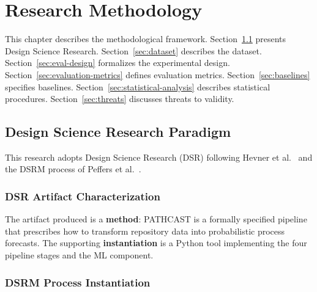
\chapter{Research Methodology}
\label{ch:methodology}

This chapter describes the methodological framework. Section~\ref{sec:dsr}
presents Design Science Research. Section~\ref{sec:dataset} describes the
dataset. Section~\ref{sec:eval-design} formalizes the experimental design.
Section~\ref{sec:evaluation-metrics} defines evaluation metrics.
Section~\ref{sec:baselines} specifies baselines.
Section~\ref{sec:statistical-analysis} describes statistical procedures.
Section~\ref{sec:threats} discusses threats to validity.


\section{Design Science Research Paradigm}
\label{sec:dsr}

This research adopts Design Science Research (DSR) following
Hevner et al.~\cite{hevner2004} and the DSRM process of Peffers et
al.~\cite{peffers2007}.

\subsection{DSR Artifact Characterization}
\label{sec:dsr-artifact}

The artifact produced is a \textbf{method}: PATHCAST is a formally
specified pipeline that prescribes how to transform repository data into
probabilistic process forecasts. The supporting \textbf{instantiation} is
a Python tool implementing the four pipeline stages and the ML component.


\subsection{DSRM Process Instantiation}
\label{sec:dsrm-instantiation}


